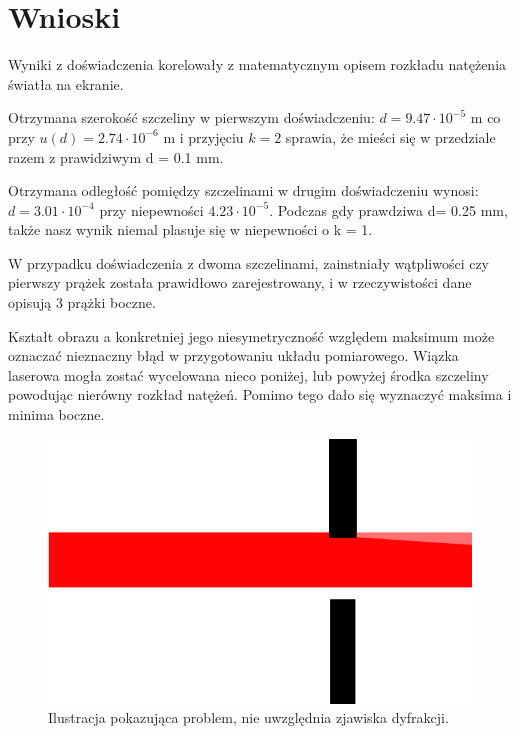 \documentclass{article}
\begin{document}
\section{Wnioski}

Wyniki z doświadczenia korelowały z matematycznym opisem rozkładu natężenia światła na ekranie.

Otrzymana szerokość szczeliny w pierwszym doświadczeniu: $d = 9.47 \cdot 10^{-5}$ m co przy $u(d)= 2.74 \cdot 10^{-6}$ m i przyjęciu $k=2$ sprawia, że mieści się w przedziale razem z prawidziwym d = 0.1 mm.

Otrzymana odległość pomiędzy szczelinami w drugim doświadczeniu wynosi: $d = 3.01 \cdot 10^{-4}$ przy niepewności $4.23 \cdot 10^{-5}$.  Podczas gdy prawdziwa d= 0.25 mm, także nasz wynik niemal plasuje się w niepewności o k = 1.

W przypadku doświadczenia z dwoma szczelinami, zainstniały wątpliwości czy pierwszy prążek została prawidłowo zarejestrowany, i w rzeczywistości dane opisują 3 prążki boczne.

Kształt obrazu a konkretniej jego niesymetryczność względem maksimum może oznaczać nieznaczny błąd w przygotowaniu układu pomiarowego. Wiązka laserowa mogła zostać wycelowana nieco poniżej, lub powyżej środka szczeliny powodując nierówny rozkład natężeń. Pomimo tego dało się wyznaczyć maksima i minima boczne.

\begin{figure}[h!]
\centering
\includegraphics[scale=0.3]{ch05}
\caption{Ilustracja pokazująca problem, nie uwzględnia zjawiska dyfrakcji.}
\end{figure}





\end{document}
